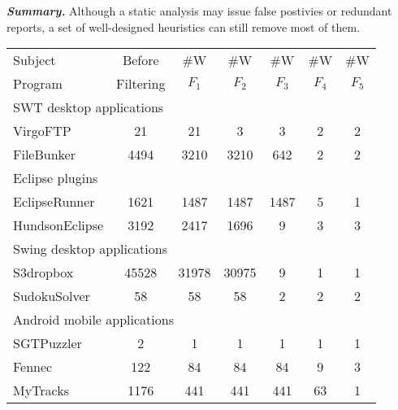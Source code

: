 \vspace{1mm}

\noindent \textbf{\textit{Summary.}} Although a static analysis may
issue false postivies or redundant reports, a set of well-designed
heuristics can still remove most of them.

\begin{table}[t]
\begin{center}
 \fontsize{9pt}{\baselineskip}\selectfont
\setlength{\tabcolsep}{.81\tabcolsep}
\hspace*{-0.2cm}
\begin{tabular}{|l||c|c|c|c|c|c|}
\hline
 Subject & Before & \#W & \#W & \#W & \#W& \#W \\
 Program & Filtering & $F_1$ & $F_2$ & $F_3$&$F_4$ & $F_5$\\
\hline \hline
\multicolumn{7}{|l|}{SWT desktop applications}   \\
 \hline
 VirgoFTP &  21 &  21 &  3 & 3 &  2 & 2\\
 \hline
 FileBunker &  4494 &  3210 &  3210 &  642 &  2 & 2\\
 \hline
 \hline
\multicolumn{7}{|l|}{Eclipse plugins}   \\
 \hline
 EclipseRunner&  1621 &  1487 &  1487 & 1487 &  5 & 1\\
 \hline
 HundsonEclipse&  3192 &  2417 &  1696 & 9 &  3 & 3\\
 \hline
 \hline
\multicolumn{7}{|l|}{Swing desktop applications}   \\
 \hline
 S3dropbox&  45528 &  31978 &  30975 & 9 &  1 & 1\\
 \hline
 SudokuSolver &  58 &  58 &  58 & 2 &  2 & 2\\
 \hline
 \hline
\multicolumn{7}{|l|}{Android mobile applications}   \\
 \hline
 SGTPuzzler&  2 &  1 &  1 & 1 &  1 & 1\\
 \hline
 Fennec &  122 &  84 & 84 & 84 &  9 & 3\\
 \hline
 MyTracks &  1176 &  441 &  441 & 441 &  63 & 1 \\
\hline
\end{tabular}
\end{center}
\vspace{-15pt}
\end{table}


